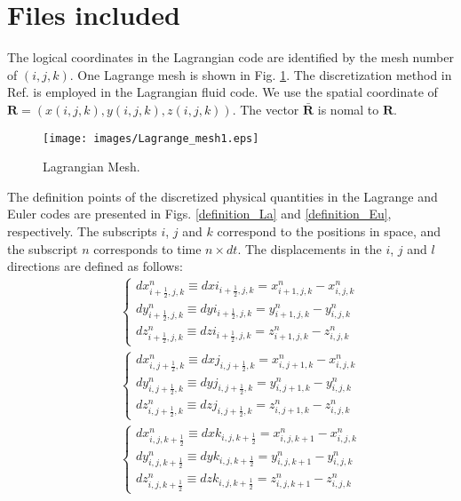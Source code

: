 %

\section{Files included}

The logical coordinates in the Lagrangian code are identified by the mesh number of $( i, j, k )$. One Lagrange mesh is shown in Fig. \ref{Lmesh}. The discretization method in Ref. \cite{Schulz} is employed in the Lagrangian fluid code. 
We use the spatial coordinate of $ {\bm R} = (x(i, j, k), y(i, j, k), z(i, j, k))$. The vector $ {\bar {\bm R}} $ is nomal to $ {\bm R}$. 
\begin{figure}[H]
	\centering
	\texttt{[image: images/Lagrange\_mesh1.eps]}
	\caption{Lagrangian Mesh.}\label{Lmesh}
\end{figure}

The definition points of the discretized physical quantities in the Lagrange and Euler codes are presented in Figs. \ref {definition_La} and \ref{definition_Eu}, respectively. The subscripts $i$, $j$ and $k$ correspond to the positions in space, and the subscript $n$ corresponds to time $n\times dt$. The displacements in the $i$, $j$ and $l$ directions are defined as follows: 
	\begin{eqnarray*}
		&&\begin{cases}
			dx^n_{i+\frac{1}{2},j,k} \equiv dxi_{i+\frac{1}{2},j,k}=x^n_{i+1,j,k}-x^n_{i,j,k}\\
			dy^n_{i+\frac{1}{2},j,k} \equiv dyi_{i+\frac{1}{2},j,k}=y^n_{i+1,j,k}-y^n_{i,j,k}\\
			dz^n_{i+\frac{1}{2},j,k} \equiv dzi_{i+\frac{1}{2},j,k}=z^n_{i+1,j,k}-z^n_{i,j,k}
		\end{cases}\\
		&&\begin{cases}
			dx^n_{i,j+\frac{1}{2},k} \equiv dxj_{i,j+\frac{1}{2},k}=x^n_{i,j+1,k}-x^n_{i,j,k}\\
			dy^n_{i,j+\frac{1}{2},k} \equiv dyj_{i,j+\frac{1}{2},k}=y^n_{i,j+1,k}-y^n_{i,j,k}\\
			dz^n_{i,j+\frac{1}{2},k} \equiv dzj_{i,j+\frac{1}{2},k}=z^n_{i,j+1,k}-z^n_{i,j,k}
		\end{cases}\\
		&&\begin{cases}
			dx^n_{i,j,k+\frac{1}{2}} \equiv dxk_{i,j,k+\frac{1}{2}}=x^n_{i,j,k+1}-x^n_{i,j,k}\\
			dy^n_{i,j,k+\frac{1}{2}} \equiv dyk_{i,j,k+\frac{1}{2}}=y^n_{i,j,k+1}-y^n_{i,j,k}\\
			dz^n_{i,j,k+\frac{1}{2}} \equiv dzk_{i,j,k+\frac{1}{2}}=z^n_{i,j,k+1}-z^n_{i,j,k}
		\end{cases}\\
	\end{eqnarray*}	

